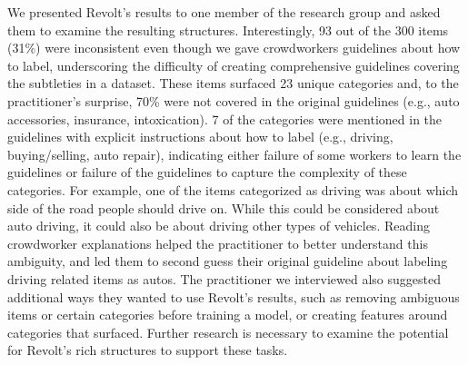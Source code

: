We presented Revolt's results to one member of the research group and asked them to examine the resulting structures. Interestingly, 93 out of the 300 items (31\%) were inconsistent even though we gave crowdworkers guidelines about how to label, underscoring the difficulty of creating comprehensive guidelines covering the subtleties in a dataset. These items surfaced 23 unique categories and, to the practitioner's surprise, 70\% were not covered in the original guidelines (e.g., auto accessories, insurance, intoxication). 7 of the categories were mentioned in the guidelines with explicit instructions about how to label (e.g., driving, buying/selling, auto repair), indicating either failure of some workers to learn the guidelines or failure of the guidelines to capture the complexity of these categories. 
For example, one of the items categorized as driving was about which side of the road people should drive on. While this could be considered about auto driving, it could also be about driving other types of vehicles. %
Reading crowdworker explanations helped the practitioner to better understand this ambiguity, and led them to second guess their original guideline about labeling driving related items as autos.  The practitioner we interviewed also suggested additional ways they wanted to use Revolt's results, such as removing ambiguous items or certain categories before training a model, or creating features around categories that surfaced. Further research is necessary to examine the potential for Revolt's rich structures to support these tasks.

